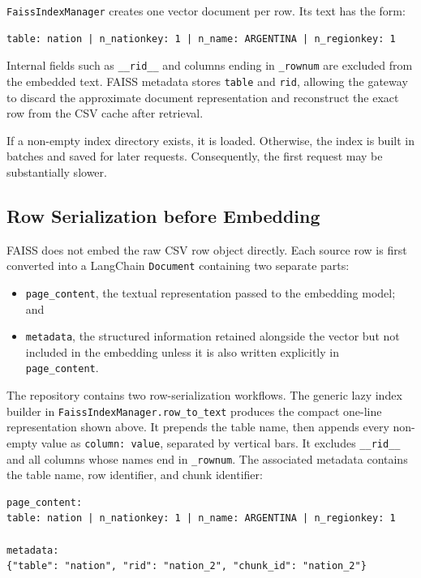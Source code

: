 \documentclass[11pt,a4paper]{article}
\newcommand{\code}[1]{\texttt{#1}}
\begin{document}
\code{FaissIndexManager} creates one vector document per row. Its text has the form:

\begin{lstlisting}[style=codestyle]
table: nation | n_nationkey: 1 | n_name: ARGENTINA | n_regionkey: 1
\end{lstlisting}

Internal fields such as \code{\_\_rid\_\_} and columns ending in
\code{\_rownum} are excluded from the embedded text. FAISS metadata stores
\code{table} and \code{rid}, allowing the gateway to discard the approximate
document representation and reconstruct the exact row from the CSV cache after
retrieval.

If a non-empty index directory exists, it is loaded. Otherwise, the index is built
in batches and saved for later requests. Consequently, the first request may be
substantially slower.

\subsection{Row Serialization before Embedding}

FAISS does not embed the raw CSV row object directly. Each source row is first
converted into a LangChain \code{Document} containing two separate parts:

\begin{itemize}
  \item \code{page\_content}, the textual representation passed to the embedding
        model; and
  \item \code{metadata}, the structured information retained alongside the vector
        but not included in the embedding unless it is also written explicitly in
        \code{page\_content}.
\end{itemize}

The repository contains two row-serialization workflows. The generic lazy index
builder in \code{FaissIndexManager.row\_to\_text} produces the compact one-line
representation shown above. It prepends the table name, then appends every
non-empty value as \code{column: value}, separated by vertical bars. It excludes
\code{\_\_rid\_\_} and all columns whose names end in \code{\_rownum}. The
associated metadata contains the table name, row identifier, and chunk identifier:

\begin{lstlisting}[style=codestyle]
page_content:
table: nation | n_nationkey: 1 | n_name: ARGENTINA | n_regionkey: 1

metadata:
{"table": "nation", "rid": "nation_2", "chunk_id": "nation_2"}
\end{lstlisting}
\end{document}

